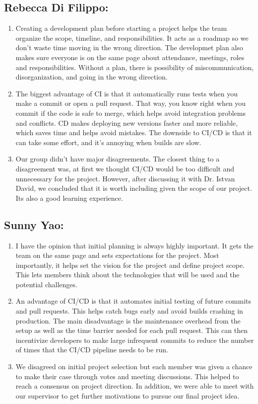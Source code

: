 \documentclass{article}
\begin{document}
\subsection*{Rebecca Di Filippo:}\label{subsec:rebecca-difilippo-reflection}
\begin{enumerate}
  \item Creating a development plan before starting a project helps the team organize the scope,
   timeline, and responsibilities. It acts as a roadmap so we don’t waste time
    moving in the wrong direction. The developmet plan also makes sure everyone is on the same page 
    about attendance, meetings, roles and responsibilities. Without a plan, there is possibility of miscommunication,
    disorganization, and going in the wrong direction.
  \item The biggest advantage of CI is that it automatically runs tests when you make a commit
   or open a pull request. That way, you know right when you commit if the code is safe to merge, which helps 
   avoid integration problems and conflicts. CD makes deploying new versions faster and more reliable,
    which saves time and helps avoid mistakes. The downside to CI/CD is that it can take some effort,
    and it’s annoying when builds are slow.
  \item Our group didn’t have major disagreements. The closest thing to a disagreement was, at first we
  thought CI/CD would be too difficult and unnecessary for the project. However, after discussing it
  with Dr. Istvan David, we concluded that it is worth including given the scope of our project. Its also
  a good learning experience.
\end{enumerate}

\newpage{}

\subsection*{Sunny Yao:}\label{subsec:sunny-yao-reflection}
\begin{enumerate}
  \item I have the opinion that initial planning is always highly important.
  It gets the team on the same page and sets expectations for the project. 
  Most importantly, it helps set the vision for the project and define project scope.
  This lets members think about the technologies that will be used and the potential challenges. 
  \item An advantage of CI/CD is that it automates initial testing of future
commits and pull requests. This helps catch bugs early and avoid builds crashing in production.
The main disadvantage is the maintenance overhead from the setup as well as the
time barrier needed for each pull request. This can then incentivize 
developers to make large infrequent commits to reduce the number of times that
the CI/CD pipeline needs to be run.
  \item We disagreed on initial project selection but each member was given
a chance to make their case through votes and meeting discussions. This helped to
reach a consensus on project direction. In addition, we were able to meet with our 
supervisor to get further motivations to pursue our final project idea.
\end{enumerate}
\newpage{}
\end{document}
